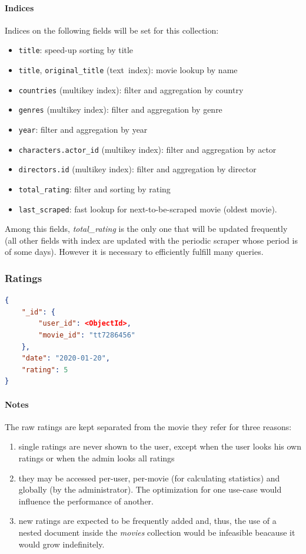\documentclass[11pt]{article}
\begin{document}
\paragraph{Indices} 
Indices on the following fields will be set for this collection:
\begin{itemize}
	\item \texttt{title}: speed-up sorting by title
	\item \texttt{title}, \texttt{original\_title} (text\ index): movie lookup 
			by name
	\item \texttt{countries} (multikey index): filter and aggregation by country
	\item \texttt{genres} (multikey index): filter and aggregation by genre
	\item \texttt{year}: filter and aggregation by year
	\item \texttt{characters.actor\_id} (multikey index): filter and aggregation by actor
	\item \texttt{directors.id} (multikey index): filter and aggregation by director
	\item \texttt{total\_rating}: filter and sorting by rating
	\item \texttt{last\_scraped}: fast lookup for next-to-be-scraped movie (oldest movie).
\end{itemize}

Among this fields, \emph{total\_rating} is the only one that will be updated 
frequently (all other fields with index are updated with the periodic scraper 
whose period is of some days). However it is necessary to efficiently fulfill 
many queries.

\subsubsection{Ratings}
\label{sec:ratings}

\begin{lstlisting}[language=json]	
{
	"_id": {
		"user_id": <ObjectId>,
		"movie_id": "tt7286456"
	},
	"date": "2020-01-20",
	"rating": 5
}
\end{lstlisting}

\paragraph{Notes}
The raw ratings are kept separated from the movie they refer for three reasons:
\begin{enumerate}
	\item single ratings are never shown to the user, except when the user 
			looks his own ratings or when the admin looks all ratings	
	\item they may be accessed per-user, per-movie (for calculating 	
			statistics) and globally (by the administrator). The optimization for one use-case would influence the performance of another.
	\item new ratings are expected to be frequently added and, thus, the use of 
		a nested document inside the \emph{movies} collection would be 
		infeasible beacause it would grow indefinitely. 
\end{enumerate} 
\end{document}
